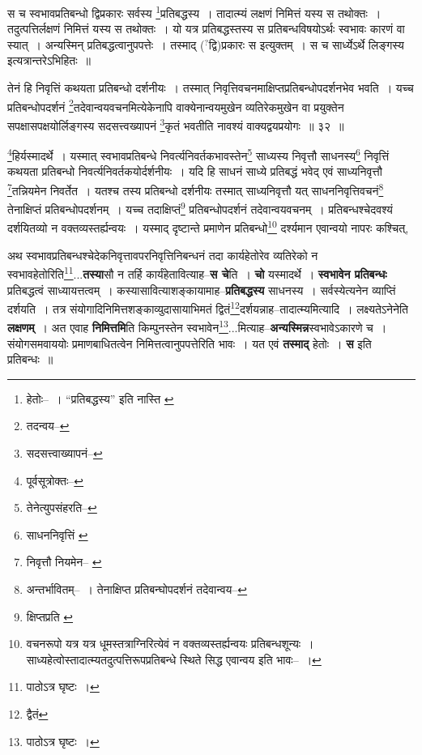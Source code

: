 \documentclass[article,12pt,a4paper]{memoir}
\newcommand{\unclear}[1]{($^{?}$#1)}
\begin{document}
	  \pstart स च स्वभावप्रतिबन्धो द्विप्रकारः सर्वस्य \footnote{हेतोः--\cite{dp-msD-n} । “प्रतिबद्धस्य” इति नास्ति \cite{dp-msA} \cite{dp-edP} \cite{dp-edH}}प्रतिबद्धस्य । तादात्म्यं लक्षणं निमित्तं यस्य स तथोक्तः । तदुत्पत्तिर्लक्षणं निमित्तं यस्य स तथोक्तः । यो यत्र प्रतिबद्धस्तस्य स प्रतिबन्धविषयोऽर्थः स्वभावः कारणं वा स्यात् । अन्यस्मिन् प्रतिबद्धत्वानुपपत्तेः । तस्माद् \unclear{द्वि}प्रकारः स इत्युक्तम् । स च सार्ध्येऽर्थे लिङ्गस्य इत्यत्रान्तरेऽभिहितः ॥
	\pend
       
	  \bigskip
	  \begingroup
	

	  \pstart तेनं हि निवृत्तिं कथयता प्रतिबन्धो दर्शनीयः । तस्मात् निवृत्तिवचनमाक्षिप्तप्रतिबन्धोपदर्शनभेव भवति । यच्च प्रतिबन्धोपदर्शनं \footnote{तदन्वय--\cite{dp-msC}}तदेवान्वयवचनमित्येकेनापि वाक्येनान्वयमुखेन व्यतिरेकमुखेन वा प्रयुक्तेन सपक्षासपक्षयोर्लिङ्गस्य सदसत्त्वख्यापनं \footnote{सदसत्त्वाख्यापनं--\cite{dp-msC}}कृतं भवतीति नावश्यं वाक्यद्वयप्रयोगः ॥ ३२ ॥
	\pend
      
	  \endgroup
	 

	  \pstart \footnote{पूर्वसूत्रोक्तः--\cite{dp-msD-n}}हिर्यस्मादर्थे । यस्मात् स्वभावप्रतिबन्धे निवर्त्यनिवर्तकभावस्तेन\footnote{तेनेत्युपसंहरति--\cite{dp-msD-n}} साध्यस्य निवृत्तौ साधनस्य\footnote{साधननिवृत्तिं \cite{dp-msC} \cite{dp-msD}} निवृत्तिं कथयता प्रतिबन्धो निवर्त्यनिवर्तकयोर्दर्शनीयः । यदि हि साधनं साध्ये प्रतिबद्धं भवेद् एवं साध्यनिवृत्तौ \footnote{निवृत्तौ नियमेन--\cite{dp-msB} \cite{dp-msC} \cite{dp-msD}}तन्नियमेन निवर्तेत । यतश्च तस्य प्रतिबन्धो दर्शनीयः तस्मात् साध्यनिवृत्तौ यत् साधननिवृत्तिवचनं\footnote{अन्तर्भावितम्--\cite{dp-msD-n} । तेनाक्षिप्त प्रतिबन्घोपदर्शनं तदेवान्वय--\cite{dp-msB}} तेनाक्षिप्तं प्रतिबन्धोपदर्शनम् । यच्च तदाक्षिप्तं\footnote{क्षिप्तप्रति \cite{dp-msA} \cite{dp-edP} \cite{dp-edH} \cite{dp-edE} \cite{dp-edN}} प्रतिबन्धोपदर्शनं तदेवान्वयवचनम् । प्रतिबन्धश्चेदवश्यं दर्शयितव्यो न वक्तव्यस्तर्ह्यन्वयः । यस्माद् दृष्टान्ते प्रमाणेन प्रतिबन्धो\footnote{वचनरूपो यत्र यत्र धूमस्तत्राग्निरित्येवं न वक्तव्यस्तर्ह्यन्वयः प्रतिबन्धशून्यः । साध्यहेत्वोस्तादात्म्यतदुत्पत्तिरूपप्रतिबन्धे स्थिते सिद्ध एवान्वय इति भावः--\cite{dp-msD-n} ।} दर्श्यमान एवान्वयो नापरः कश्चित्,
	\pend
      
	  \endgroup
	

	  \pstart अथ स्वभावप्रतिबन्धश्चेदेकनिवृत्तावपरनिवृत्तिनिबन्धनं तदा कार्यहेतोरेव व्यतिरेको न स्वभावहेतो\leavevmode{}रिति\footnote{पाठोऽत्र घृष्टः ।}...\textbf{तस्या}सौ न तर्हि कार्यंहेतावित्याह--\textbf{स चे}ति । \textbf{चो} यस्मादर्थे । \textbf{स्वभावेन प्रतिबन्धः} प्रतिबद्धत्वं साध्यायत्तत्वम् । कस्यासावित्याशङ्कायामाह--\textbf{प्रतिबद्धस्य} साधनस्य । सर्वस्येत्यनेन व्याप्तिं दर्शयति । तत्र संयोगादिनिमित्तशङ्काव्युदासायाभिमतं द्वितं\footnote{द्वैतं}दर्शयन्नाह--तादात्म्यमित्यादि । लक्ष्यतेऽनेनेति \textbf{लक्षणम्} । अत एवाह \textbf{निमित्तमि}ति किम्पुनस्तेन स्वभावेन\footnote{पाठोऽत्र घृष्टः ।}...मित्याह--\textbf{अन्यस्मिन्न}स्वभावेऽकारणे च । संयोगसमवाययोः प्रमाणबाधितत्वेन निमित्तत्वानुपपत्तेरिति भावः । यत एवं \textbf{तस्माद्} हेतोः । \textbf{स} इति प्रतिबन्धः ॥
	\pend
      
\end{document}

